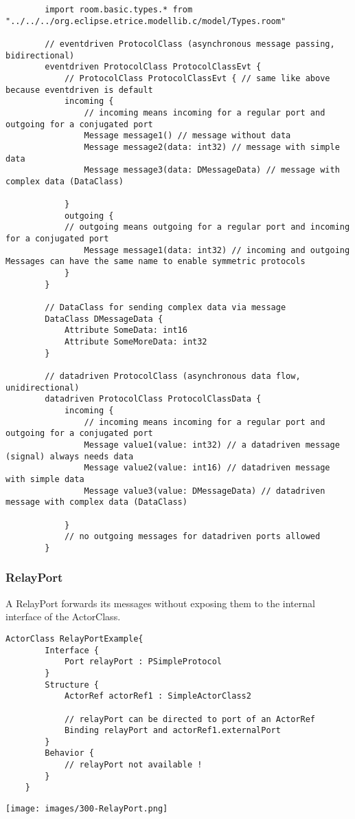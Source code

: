 		\begin{lstlisting}
		import room.basic.types.* from "../../../org.eclipse.etrice.modellib.c/model/Types.room"
		
		// eventdriven ProtocolClass (asynchronous message passing, bidirectional)
		eventdriven ProtocolClass ProtocolClassEvt {
			// ProtocolClass ProtocolClassEvt { // same like above because eventdriven is default 
			incoming {
				// incoming means incoming for a regular port and outgoing for a conjugated port
				Message message1() // message without data
				Message message2(data: int32) // message with simple data
				Message message3(data: DMessageData) // message with complex data (DataClass)
		
			}
			outgoing {
			// outgoing means outgoing for a regular port and incoming for a conjugated port
				Message message1(data: int32) // incoming and outgoing Messages can have the same name to enable symmetric protocols
			}
		}
		
		// DataClass for sending complex data via message
		DataClass DMessageData {
			Attribute SomeData: int16
			Attribute SomeMoreData: int32
		}
		
		// datadriven ProtocolClass (asynchronous data flow, unidirectional)
		datadriven ProtocolClass ProtocolClassData {
			incoming {
				// incoming means incoming for a regular port and outgoing for a conjugated port
				Message value1(value: int32) // a datadriven message (signal) always needs data
				Message value2(value: int16) // datadriven message with simple data
				Message value3(value: DMessageData) // datadriven message with complex data (DataClass)
		
			}
			// no outgoing messages for datadriven ports allowed 
		}
		\end{lstlisting}
	
	\vspace{\baselineskip}
	\vspace{\baselineskip}
	\vspace{\baselineskip}
	
\subsubsection{RelayPort}
	\hypertarget{ref:RelayPort}{}
	A RelayPort forwards its messages without exposing them to the internal interface of the ActorClass.
		
	\begin{lstlisting}[language=ROOM]
	ActorClass RelayPortExample{
		Interface {
			Port relayPort : PSimpleProtocol
		}
		Structure {
			ActorRef actorRef1 : SimpleActorClass2
			
			// relayPort can be directed to port of an ActorRef
			Binding relayPort and actorRef1.externalPort
		}
		Behavior {
			// relayPort not available !
		}
	}
	\end{lstlisting}
	\texttt{[image: images/300-RelayPort.png]}
		
